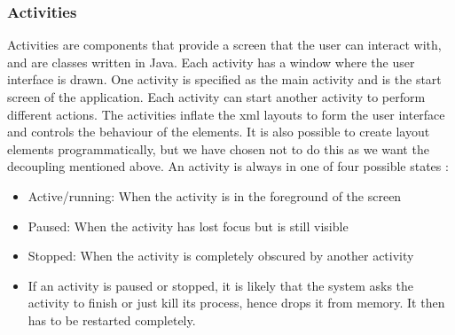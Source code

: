 \subsubsection{Activities}
Activities are components that provide a screen that the user can interact with, and are classes written in Java. Each activity has a window where the user interface is drawn. One activity is specified as the main activity and is the start screen of the application. Each activity can start another activity to perform different actions. The activities inflate the \gls{xml} layouts to form the user interface and controls the behaviour of the elements. It is also possible to create layout elements programmatically, but we have chosen not to do this as we want the decoupling mentioned above.
\newline
\newline
An activity is always in one of four possible states \cite{bib:aas}:
\begin{itemize}
\item{}Active/running: When the activity is in the foreground of the screen
\item{}Paused: When the activity has lost focus but is still visible
\item{}Stopped: When the activity is completely obscured by another activity
\item{}If an activity is paused or stopped, it is likely that the system asks the activity to finish or just kill its process, hence drops it from memory. It then has to be restarted completely.
\end{itemize}

